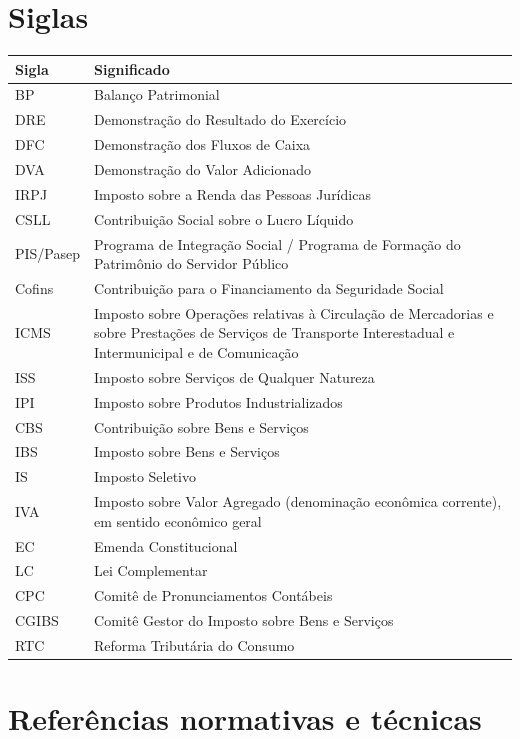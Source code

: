 \documentclass[11pt,a4paper]{article}
\begin{document}
\section{Siglas}

\begin{longtable}{p{} p{}}
\toprule
\textbf{Sigla} & \textbf{Significado}\\
\midrule
BP & Balanço Patrimonial\\
DRE & Demonstração do Resultado do Exercício\\
DFC & Demonstração dos Fluxos de Caixa\\
DVA & Demonstração do Valor Adicionado\\
IRPJ & Imposto sobre a Renda das Pessoas Jurídicas\\
CSLL & Contribuição Social sobre o Lucro Líquido\\
PIS/Pasep & Programa de Integração Social / Programa de Formação do Patrimônio do Servidor Público\\
Cofins & Contribuição para o Financiamento da Seguridade Social\\
ICMS & Imposto sobre Operações relativas à Circulação de Mercadorias e sobre Prestações de Serviços de Transporte Interestadual e Intermunicipal e de Comunicação\\
ISS & Imposto sobre Serviços de Qualquer Natureza\\
IPI & Imposto sobre Produtos Industrializados\\
CBS & Contribuição sobre Bens e Serviços\\
IBS & Imposto sobre Bens e Serviços\\
IS & Imposto Seletivo\\
IVA & Imposto sobre Valor Agregado (denominação econômica corrente), em sentido econômico geral\\
EC & Emenda Constitucional\\
LC & Lei Complementar\\
CPC & Comitê de Pronunciamentos Contábeis\\
CGIBS & Comitê Gestor do Imposto sobre Bens e Serviços\\
RTC & Reforma Tributária do Consumo\\
\bottomrule
\end{longtable}

\section{Referências normativas e técnicas}
\end{document}
